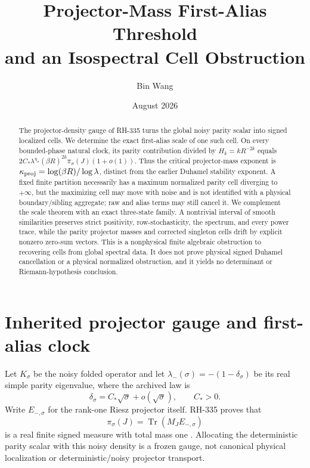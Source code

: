 \documentclass[11pt]{article}
\title{Projector-Mass First-Alias Threshold\\
and an Isospectral Cell Obstruction}
\author{Bin Wang}
\date{August 2026}
\theoremstyle{remark}
\newcommand{\Tr}{\operatorname{Tr}}
\begin{document}
\maketitle

\begin{abstract}
The projector-density gauge of RH-335 turns the global noisy parity scalar
into signed localized cells.  We determine the exact first-alias scale of one
such cell.  On every bounded-phase natural clock, its parity contribution
divided by $H_k=kR^{-2k}$ equals
$2C_*\lambda^{\eta_\sigma}(\beta R)^{2k}\pi_\sigma(J)(1+o(1))$.
Thus the critical projector-mass exponent is
$\kappa_{\rm proj}=\log(\beta R)/\log\lambda$, distinct from the earlier
Duhamel stability exponent.  A fixed finite partition necessarily has a maximum
normalized parity cell diverging to $+\infty$, but the maximizing cell may
move with noise and is not identified with a physical boundary/sibling
aggregate; raw and alias terms may still cancel it.  We complement the scale
theorem with an exact three-state family.  A nontrivial interval of smooth
similarities preserves strict positivity, row-stochasticity, the spectrum,
and every power trace, while the parity projector masses and corrected
singleton cells drift by explicit nonzero zero-sum vectors.  This is a
nonphysical finite algebraic obstruction to recovering cells from global
spectral data.  It does not prove physical signed Duhamel cancellation or a
physical normalized obstruction, and it yields no determinant or
Riemann-hypothesis conclusion.
\end{abstract}

\section{Inherited projector gauge and first-alias clock}

Let $K_\sigma$ be the noisy folded operator and let
$\lambda_-(\sigma)=-(1-\delta_\sigma)$ be its real simple parity
eigenvalue, where the archived law is
\begin{equation}\label{eq:delta-law}
 \delta_\sigma=C_*\sqrt\sigma+o(\sqrt\sigma),
 \qquad C_*>0.
\end{equation}
Write $E_{-,\sigma}$ for the rank-one Riesz projector itself.  RH-335 proves
that
\begin{equation}\label{eq:pi}
 \pi_\sigma(J)=\Tr(M_JE_{-,\sigma})
\end{equation}
is a real finite signed measure with total mass one
\citep{WangProjectorLedger2026}.  Allocating the deterministic parity scalar
with this noisy density is a frozen gauge, not canonical physical
localization or deterministic/noisy projector transport.
\end{document}

